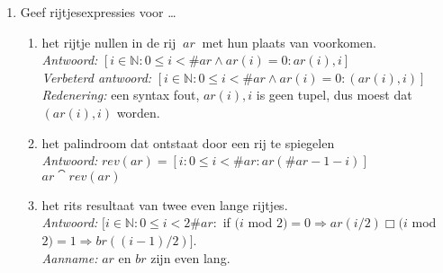 \begin{enumerate}
\begin{enumerate}
\end{enumerate}

\item Geef rijtjesexpressies voor \ldots
\begin{enumerate}

    \item het rijtje nullen in de rij $~ar~$ met hun plaats van voorkomen. \\
        \emph{Antwoord:} $[ i \in \mathbb{N} : 0 \leq i < \#ar \land ar(i) = 0: ar(i), i]$ \\
        \emph{Verbeterd antwoord:} $ [i \in \mathbb{N} : 0 \leqslant i < \#ar \wedge ar(i) = 0 : (ar(i), i)] $ \\
        \emph{Redenering:} een syntax fout, $ar(i),i$ is geen tupel, dus moest dat $(ar(i),i)$ worden. \\

    \item het palindroom dat ontstaat door een rij te spiegelen \\
        \emph{Antwoord:} $rev(ar) = [ i : 0 \leq i < \#ar : ar(\#ar-1-i)]$ \\
            $ar \cat rev(ar)$ \\

    \item het rits resultaat van twee even lange rijtjes. \\
        \emph{Antwoord:} $[i \in \mathbb{N} : 0 \leq i < 2 \#ar :$ if $(i$ mod $2) = 0 \Rightarrow ar(i / 2) \Box (i$ mod $2 ) = 1 \Rightarrow br((i-1) / 2)]$. \\
        \emph{Aanname:} $ar$ en $br$ zijn even lang. \\

\end{enumerate}
\end{enumerate}
